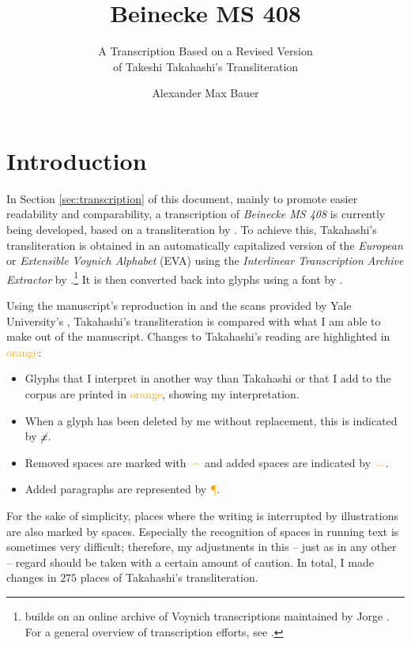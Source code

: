 \documentclass{scrarticle}
\title{Beinecke MS 408}
\subtitle{A Transcription Based on a Revised Version\\of Takeshi Takahashi's Transliteration}
\author{Alexander Max Bauer}
\date{}
\begin{document}
\maketitle


\section{Introduction}\label{sec:introduction}
In Section \ref{sec:transcription} of this document, mainly to promote easier readability and comparability, a transcription of \textit{Beinecke MS 408} is currently being developed, based on a transliteration by \citet{takahashi_voynich_2004}.
To achieve this, Takahashi's transliteration is obtained in an automatically capitalized version of the \textit{European} or \textit{Extensible Voynich Alphabet} (EVA) using the \textit{Interlinear Transcription Archive Extractor} by \citet{schwerdtfeger_voynich_2004}.\footnote{\citet{schwerdtfeger_voynich_2004} builds on an online archive of Voynich transcriptions maintained by Jorge \citet{stolfi_voynich_1998}. For a general overview of transcription efforts, see \citet{zandbergen_text_2023}.}
It is then converted back into glyphs using a font by \citet{bettencourt_voynich_2019}.

Using the manuscript's reproduction in \citet{clemens_voynich_2016} and the scans provided by Yale University's \citet{beinecke_voynich_2004}, Takahashi's transliteration is compared with what I am able to make out of the manuscript.
Changes to Takahashi's reading are highlighted in \textcolor{orange}{orange}:

\begin{itemize}
   \item Glyphs that I interpret in another way than Takahashi or that I add to the corpus are printed in \textcolor{orange}{orange}, showing my interpretation.
   \item When a glyph has been deleted by me without replacement, this is indicated by \textcolor{orange}{$\cancel{x}$}.
   \item Removed spaces are marked with \textcolor{orange}{$\frown$} and added spaces are indicated by \textcolor{orange}{$\smile$}.
   \item Added paragraphs are represented by \textcolor{orange}{{\P}}.
\end{itemize}

For the sake of simplicity, places where the writing is interrupted by illustrations are also marked by spaces.
Especially the recognition of spaces in running text is sometimes very difficult; therefore, my adjustments in this -- just as in any other -- regard should be taken with a certain amount of caution.
In total, I made changes in $275$ places of Takahashi's transliteration.
\end{document}
